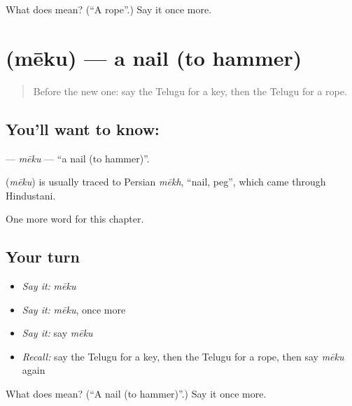\begin{tcolorbox}[breakable,colback=teal!4,colframe=teal!35!black,title={Before you move on}]
What does  mean? (\textquotedblleft{}A rope\textquotedblright{}.) Say it once more.
\end{tcolorbox}
\section[\texorpdfstring{\te{మేకు} (mēku)}{మేకు (mēku)}]{ (mēku) — a nail (to hammer)}

\label{lesson:TE-C110-meku}



\begin{quote}
Before the new one: say the Telugu for a key, then the Telugu for a rope.
\end{quote}

\subsection*{You'll want to know: }
\textbf{} — \emph{mēku} — \textquotedblleft{}a nail (to hammer)\textquotedblright{}.

\begin{cousinweb}
\textbf{} (\emph{mēku}) is usually traced to Persian \emph{mēkh}, \textquotedblleft{}nail, peg\textquotedblright{}, which came through Hindustani.
\end{cousinweb}

\begin{grammarlens}[title={What you've built}]
One more word for this chapter.
\end{grammarlens}

\subsection*{Your turn}
\begin{itemize}
\raggedright
  \item \emph{Say it:} \emph{mēku}
  \item \emph{Say it:} \emph{mēku}, once more
  \item \emph{Say it:} say \emph{mēku}
  \item \emph{Recall:} say the Telugu for a key, then the Telugu for a rope, then say \emph{mēku} again
\end{itemize}

\begin{tcolorbox}[breakable,colback=teal!4,colframe=teal!35!black,title={Before you move on}]
What does  mean? (\textquotedblleft{}A nail (to hammer)\textquotedblright{}.) Say it once more.
\end{tcolorbox}
